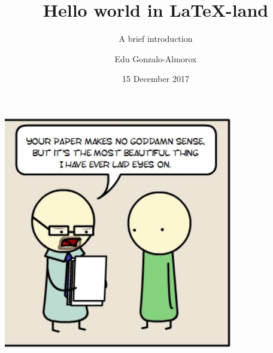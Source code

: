 \documentclass[10pt]{beamer}
\title[NERDS - Introduction to \LaTeX]{Hello world in \LaTeX-land}
\subtitle[]{A brief introduction}
\author{Edu Gonzalo-Almorox}
\institute{\words{Newcastle University Business School - Economics}}
\date{15 December 2017}
\begin{document}
{
\begin{frame}
\maketitle
\end{frame}
}




\begingroup





\begin{frame}
 
 \begin{center}
  \includegraphics[width=0.75\textwidth]{latex-intro.png}
   \end{center}    

\end{frame}
\end{document}
